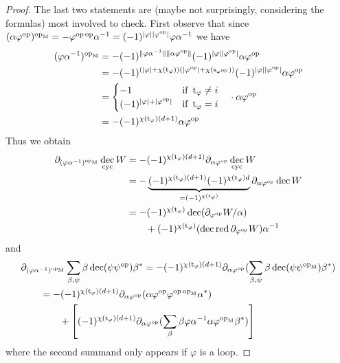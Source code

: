 \documentclass[a4paper,11pt]{amsart}
\theoremstyle{definition}
\DeclareMathOperator{\op}{op}
\DeclareMathOperator{\red}{red}
\DeclareMathOperator{\dec}{dec}
\newcommand{\m}{_{\rm M}}
\newcommand{\ci}[1]{\chi(#1)}
\newcommand{\st}[1]{\operatorname{s}_{#1}}
\newcommand{\ta}[1]{\operatorname{t}_{#1}}
\numberwithin{theorem}{section}
\begin{document}
\begin{proof}
The last two statements are (maybe not surprisingly, considering the formulas) most involved to check. First observe that since $(\alpha \varphi^{\op})^{\op\m} = - \varphi^{\op \op} \alpha^{-1} = (-1)^{| \varphi | | \varphi ^{\op} | } \varphi \alpha^{-1}$ we have
\begin{align*}
(\varphi \alpha^{-1})^{\op\m} & = - (-1)^{\| \varphi \alpha^{-1} \| \| \alpha \varphi^{\op} \|} (-1)^{| \varphi | | \varphi ^{\op} | } \alpha \varphi^{\op} \\
& = - (-1)^{(| \varphi | + \ci{\ta{\varphi}}) ( | \varphi^{\op} | + \ci{\st{\varphi^{\op}}})} (-1)^{| \varphi | | \varphi ^{\op} | } \alpha \varphi^{\op} \\
& = \begin{cases} -1 & \text{if } \ta\varphi \neq i \\ (-1)^{| \varphi | + | \varphi^{\op} |} & \text{if } \ta\varphi = i \end{cases} \quad \cdot \alpha \varphi^{\op} \\
& = - (-1)^{\ci{\ta\varphi} (d+1)} \alpha \varphi^{\op}
\end{align*}
Thus we obtain
\begin{align*}
\partial_{(\varphi \alpha^{-1})^{\op\m}} \dec_{\rm cyc} W & = - (-1)^{\ci{\ta\varphi} (d+1)} \partial_{\alpha \varphi^{\op}} \dec_{\rm cyc} W \\
& = - \underbrace{(-1)^{\ci{\ta\varphi} (d+1)} (-1)^{\ci{\ta\varphi} d}}_{= (-1)^{\ci{\ta\varphi}}} \partial_{\alpha \varphi^{\op}} \dec W \\
& = - (-1)^{\ci{\ta\varphi}} \dec (\partial_{\varphi^{\op}} W / \alpha) \\ & \qquad + (-1)^{\ci{\ta\varphi}} (\dec \red \partial_{\varphi^{\op}} W) \alpha^{-1}
\end{align*}
and
\begin{align*}
& \partial_{(\varphi \alpha^{-1})^{\op\m}} \sum_{\beta, \psi} \beta \dec(\psi \psi^{\op}) \beta^* = - (-1)^{\ci{\ta\varphi} (d+1)} \partial_{\alpha \varphi^{\op}} ( \sum_{\beta, \psi} \beta \dec(\psi \psi^{\op\m}) \beta^*)  \\
& \qquad = - (-1)^{\ci{\ta\varphi} (d+1)} \partial_{\alpha \varphi^{\op}} ( \alpha \varphi^{\op} \varphi^{\op \op\m} \alpha^* ) \\
& \qquad \qquad + \left[ (-1)^{\ci{\ta\varphi} (d+1)} \partial_{\alpha \varphi^{\op}} (\sum_{\beta} \beta \varphi \alpha^{-1} \alpha \varphi^{\op\m} \beta^*) \right]
\end{align*}
where the second summand only appears if $\varphi$ is a loop.


\end{proof}
\end{document}
